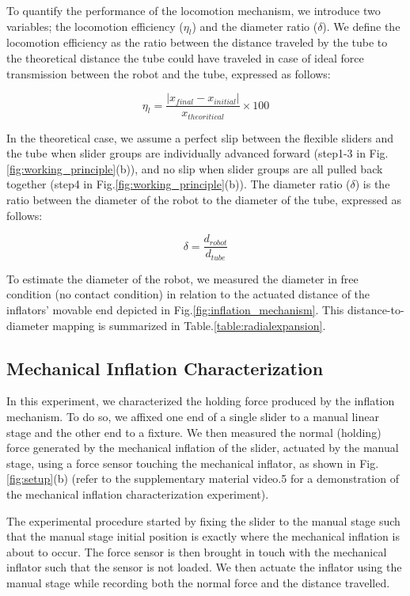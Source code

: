 \documentclass[letterpaper, 10 pt, conference]{ieeeconf}  %
\begin{document}
To quantify the performance of the locomotion mechanism, we introduce two variables; the locomotion efficiency ($\eta_{l}$) and the diameter ratio ($\delta$). We define the locomotion efficiency as  the ratio between the distance traveled by the tube to the theoretical distance the tube could have traveled in case of ideal force transmission between the robot and the tube, expressed as follows:

\begin{equation}\label{eq:locEfficiency}
    \eta_{l} = \frac{|x_{final}-x_{initial}|}{x_{theoritical}}\times 100
\end{equation}

In the theoretical case, we assume a perfect slip between the flexible sliders and the tube when slider groups are individually advanced forward (step1-3 in Fig.\ref{fig:working_principle}(b)), and no slip when slider groups are all pulled back together (step4 in Fig.\ref{fig:working_principle}(b)). The diameter ratio ($\delta$) is the ratio between the diameter of the robot to the diameter of the tube, expressed as follows:

\begin{equation}\label{slip_ratio}
    \delta = \frac{d_{robot}}{d_{tube}}
\end{equation}

To estimate the diameter of the robot, we measured the diameter in free condition (no contact condition) in relation to the actuated distance of the inflators' movable end depicted in Fig.\ref{fig:inflation_mechanism}. This distance-to-diameter mapping is summarized in Table.\ref{table:radialexpansion}.

\subsection*{Mechanical Inflation Characterization}
In this experiment, we characterized the holding force produced by the inflation mechanism. To do so, we affixed one end of a single slider to a manual linear stage and the other end to a fixture. We then measured the normal (holding) force generated by the mechanical inflation of the slider, actuated by the manual stage, using a force sensor touching the mechanical inflator, as shown in Fig.\ref{fig:setup}(b) (refer to the supplementary material video.5 for a demonstration of the mechanical inflation characterization experiment).

The experimental procedure started by fixing the slider to the manual stage such that the manual stage initial position is exactly where the mechanical inflation is about to occur. The force sensor is then brought in touch with the mechanical inflator such that the sensor is not loaded. We then actuate the inflator using the manual stage while recording both the normal force and the distance travelled. 
\end{document}
